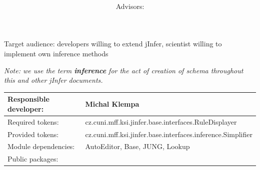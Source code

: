 \documentclass[a4paper,10pt,oneside]{article}
\title{\bf\mftitle}
\author{\mfauthor \\ Advisors: \mfadvisor}
\date{\mfplacedate}
\begin{document}
\maketitle
\noindent Target audience: developers willing to extend jInfer, scientist willing to implement own inference methods

\noindent \emph{Note: we use the term \textbf{inference} for the act of creation of schema throughout this and other jInfer documents.}

\noindent \begin{tabular}{|l|l|} \hline
Responsible developer: & Michal Klempa \\ \hline
Required tokens:       & cz.cuni.mff.ksi.jinfer.base.interfaces.RuleDisplayer \\ \hline
Provided tokens:       & cz.cuni.mff.ksi.jinfer.base.interfaces.inference.Simplifier \\ \hline
Module dependencies:   & AutoEditor, Base, JUNG, Lookup \\ \hline
Public packages:       & \\ \hline
\end{tabular}
\end{document}
